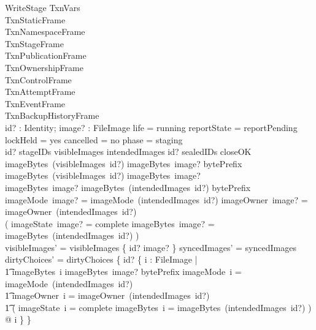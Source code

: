 \documentclass{article}
\begin{document}
\begin{schema}{WriteStage}
	\Delta TxnVars \\
	TxnStaticFrame \\
	TxnNamespaceFrame \\
	TxnStageFrame \\
	TxnPublicationFrame \\
	TxnOwnershipFrame \\
	TxnControlFrame \\
	TxnAttemptFrame \\
	TxnEventFrame \\
	TxnBackupHistoryFrame \\
	id? : Identity; image? : FileImage
	\where
	life = running \land reportState = reportPending \land lockHeld = yes \land
	cancelled = no \land phase = staging \\
	id? \in stageIDs \cap \dom visibleImages \cap \dom intendedImages \land
	id? \notin sealedIDs \cup closeOK \\
	imageBytes~(visibleImages~id?) \mapsto imageBytes~image? \in bytePrefix \land
	imageBytes~(visibleImages~id?) \neq imageBytes~image? \\
	imageBytes~image? \mapsto imageBytes~(intendedImages~id?) \in bytePrefix \\
	imageMode~image? = imageMode~(intendedImages~id?) \land
	imageOwner~image? = imageOwner~(intendedImages~id?) \\
	( imageState~image? = complete \iff
	imageBytes~image? = imageBytes~(intendedImages~id?) ) \\
	visibleImages' = visibleImages \oplus \{ id? \mapsto image? \} \land
	syncedImages' = syncedImages \\
	dirtyChoices' = dirtyChoices \oplus \{ id? \mapsto \{ i : FileImage | \\
	\t1 imageBytes~i \mapsto imageBytes~image? \in bytePrefix \land
	imageMode~i = imageMode~(intendedImages~id?) \land \\
	\t1 imageOwner~i = imageOwner~(intendedImages~id?) \land \\
	\t1 ( imageState~i = complete \iff
	imageBytes~i = imageBytes~(intendedImages~id?) ) @ i \} \}
\end{schema}
\end{document}
